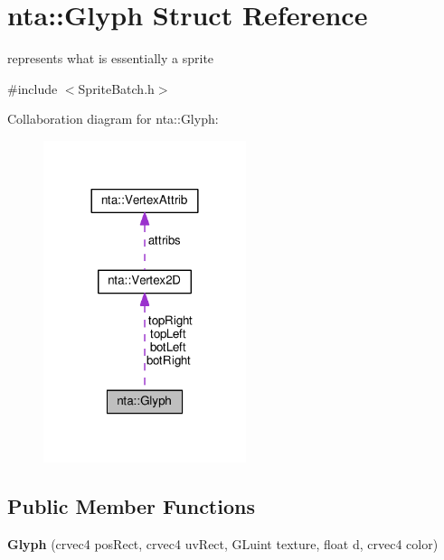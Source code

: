\hypertarget{structnta_1_1Glyph}{}\section{nta\+:\+:Glyph Struct Reference}
\label{structnta_1_1Glyph}


represents what is essentially a sprite  




{\ttfamily \#include $<$Sprite\+Batch.\+h$>$}



Collaboration diagram for nta\+:\+:Glyph\+:
\nopagebreak
\begin{figure}[H]
\begin{center}
\leavevmode
\includegraphics[width=168pt]{d8/d54/structnta_1_1Glyph__coll__graph}
\end{center}
\end{figure}
\subsection*{Public Member Functions}
\begin{DoxyCompactItemize}
\item 
\mbox{\label{structnta_1_1Glyph_ae400ec6b413eee3d1f091ff9cc594bba}} 
{\bfseries Glyph} (crvec4 pos\+Rect, crvec4 uv\+Rect, G\+Luint texture, float d, crvec4 color)
\end{DoxyCompactItemize}

